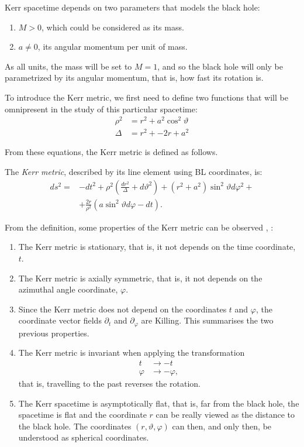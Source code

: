 Kerr spacetime depends on two parameters that models the black hole:
\begin{enumerate}
	\item $M > 0$, which could be considered as its mass.
	\item $a \neq 0$, its angular momentum per unit of mass.
\end{enumerate}

As all units, the mass will be set to $M = 1$, and so the black hole will only be parametrized by its angular momentum, that is, how fast its rotation is.

To introduce the Kerr metric, we first need to define two functions that will be omnipresent in the study of this particular spacetime:
\begin{align}
	\rho^2 &= r^2 + a^2\cos^2\vartheta \\
	\Delta &= r^2 + -2r + a^2
\end{align}

From these equations, the Kerr metric is defined as follows.
\begin{definition}
	The \emph{Kerr metric}, described by its line element using \ac{BL} coordinates, is:
	\begin{align}
		\label{eq:kerrmetric}
		ds^2 = &-dt^2 + \rho^2\left(\frac{dr^2}{\Delta} + d\vartheta^2\right) + \left(r^2 + a^2\right)\sin^2\vartheta d\varphi^2 + \\
		\nonumber
		&+ \frac{2r}{\rho^2}\left(a\sin^2\vartheta d\varphi - dt\right).
	\end{align}
\end{definition}

From the definition, some properties of the Kerr metric can be observed \cite[Sec. 2.1]{galindo14}, \cite[pp. 58-59]{oneill95}:
\begin{enumerate}
	\item The Kerr metric is stationary, that is, it not depends on the time coordinate, $t$.
	\item The Kerr metric is axially symmetric, that is, it not depends on the azimuthal angle coordinate, $\varphi$.
	\item Since the Kerr metric does not depend on the coordinates $t$ and $\varphi$, the coordinate vector fields $\partial_t$ and $\partial_\varphi$ are Killing. This summarises the two previous properties.
	\item The Kerr metric is invariant when applying the transformation
	\begin{align*}
		t &\to -t \\
		\varphi &\to -\varphi,
	\end{align*}
	that is, travelling to the past reverses the rotation.
	\item The Kerr spacetime is asymptotically flat, that is, far from the black hole, the spacetime is flat and the coordinate $r$ can be really viewed as the distance to the black hole. The coordinates $(r, \vartheta, \varphi)$ can then, and only then, be understood as spherical coordinates.
\end{enumerate}


